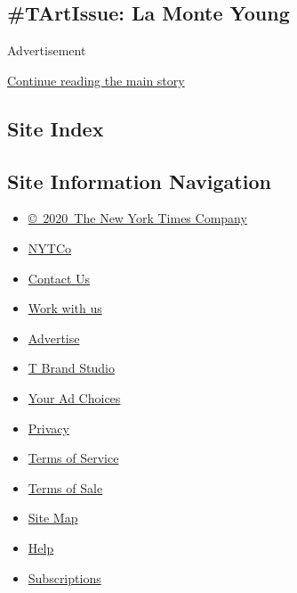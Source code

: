 \hypertarget{tartissue-la-monte-young}{%
\subsection{\#TArtIssue: La Monte
Young}\label{tartissue-la-monte-young}}

Advertisement

\protect\hyperlink{after-bottom}{Continue reading the main story}

\hypertarget{site-index}{%
\subsection{Site Index}\label{site-index}}

\hypertarget{site-information-navigation}{%
\subsection{Site Information
Navigation}\label{site-information-navigation}}

\begin{itemize}
\tightlist
\item
  \href{https://help.nytimes3xbfgragh.onion/hc/en-us/articles/115014792127-Copyright-notice}{©~2020~The
  New York Times Company}
\end{itemize}

\begin{itemize}
\tightlist
\item
  \href{https://www.nytco.com/}{NYTCo}
\item
  \href{https://help.nytimes3xbfgragh.onion/hc/en-us/articles/115015385887-Contact-Us}{Contact
  Us}
\item
  \href{https://www.nytco.com/careers/}{Work with us}
\item
  \href{https://nytmediakit.com/}{Advertise}
\item
  \href{http://www.tbrandstudio.com/}{T Brand Studio}
\item
  \href{https://www.nytimes3xbfgragh.onion/privacy/cookie-policy\#how-do-i-manage-trackers}{Your
  Ad Choices}
\item
  \href{https://www.nytimes3xbfgragh.onion/privacy}{Privacy}
\item
  \href{https://help.nytimes3xbfgragh.onion/hc/en-us/articles/115014893428-Terms-of-service}{Terms
  of Service}
\item
  \href{https://help.nytimes3xbfgragh.onion/hc/en-us/articles/115014893968-Terms-of-sale}{Terms
  of Sale}
\item
  \href{https://spiderbites.nytimes3xbfgragh.onion}{Site Map}
\item
  \href{https://help.nytimes3xbfgragh.onion/hc/en-us}{Help}
\item
  \href{https://www.nytimes3xbfgragh.onion/subscription?campaignId=37WXW}{Subscriptions}
\end{itemize}
